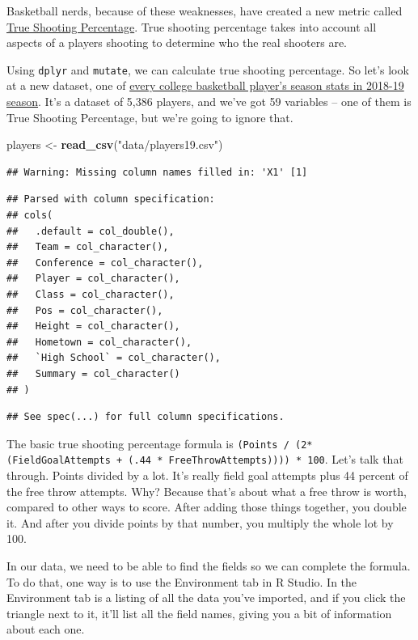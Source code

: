 \documentclass[]{book}
\newenvironment{Shaded}{\begin{snugshade}}{\end{snugshade}}
\newcommand{\KeywordTok}[1]{\textcolor[rgb]{0.13,0.29,0.53}{\textbf{#1}}}
\newcommand{\StringTok}[1]{\textcolor[rgb]{0.31,0.60,0.02}{#1}}
\newcommand{\NormalTok}[1]{#1}
\begin{document}
Basketball nerds, because of these weaknesses, have created a new metric
called
\href{https://en.wikipedia.org/wiki/True_shooting_percentage}{True
Shooting Percentage}. True shooting percentage takes into account all
aspects of a players shooting to determine who the real shooters are.

Using \texttt{dplyr} and \texttt{mutate}, we can calculate true shooting
percentage. So let's look at a new dataset, one of
\href{https://unl.box.com/s/s1wzw61u9ia50qmirfhuvprgpmmah9rj}{every
college basketball player's season stats in 2018-19 season}. It's a
dataset of 5,386 players, and we've got 59 variables -- one of them is
True Shooting Percentage, but we're going to ignore that.

\begin{Shaded}
\begin{Highlighting}[]
\NormalTok{players <-}\StringTok{ }\KeywordTok{read_csv}\NormalTok{(}\StringTok{"data/players19.csv"}\NormalTok{)}
\end{Highlighting}
\end{Shaded}

\begin{verbatim}
## Warning: Missing column names filled in: 'X1' [1]
\end{verbatim}

\begin{verbatim}
## Parsed with column specification:
## cols(
##   .default = col_double(),
##   Team = col_character(),
##   Conference = col_character(),
##   Player = col_character(),
##   Class = col_character(),
##   Pos = col_character(),
##   Height = col_character(),
##   Hometown = col_character(),
##   `High School` = col_character(),
##   Summary = col_character()
## )
\end{verbatim}

\begin{verbatim}
## See spec(...) for full column specifications.
\end{verbatim}

The basic true shooting percentage formula is
\texttt{(Points\ /\ (2*(FieldGoalAttempts\ +\ (.44\ *\ FreeThrowAttempts))))\ *\ 100}.
Let's talk that through. Points divided by a lot. It's really field goal
attempts plus 44 percent of the free throw attempts. Why? Because that's
about what a free throw is worth, compared to other ways to score. After
adding those things together, you double it. And after you divide points
by that number, you multiply the whole lot by 100.

In our data, we need to be able to find the fields so we can complete
the formula. To do that, one way is to use the Environment tab in R
Studio. In the Environment tab is a listing of all the data you've
imported, and if you click the triangle next to it, it'll list all the
field names, giving you a bit of information about each one.
\end{document}
